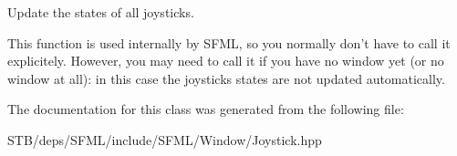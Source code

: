 Update the states of all joysticks. 

This function is used internally by S\+F\+M\+L, so you normally don't have to call it explicitely. However, you may need to call it if you have no window yet (or no window at all)\+: in this case the joysticks states are not updated automatically. 

The documentation for this class was generated from the following file\+:\begin{DoxyCompactItemize}
\item 
S\+T\+B/deps/\+S\+F\+M\+L/include/\+S\+F\+M\+L/\+Window/Joystick.\+hpp\end{DoxyCompactItemize}
